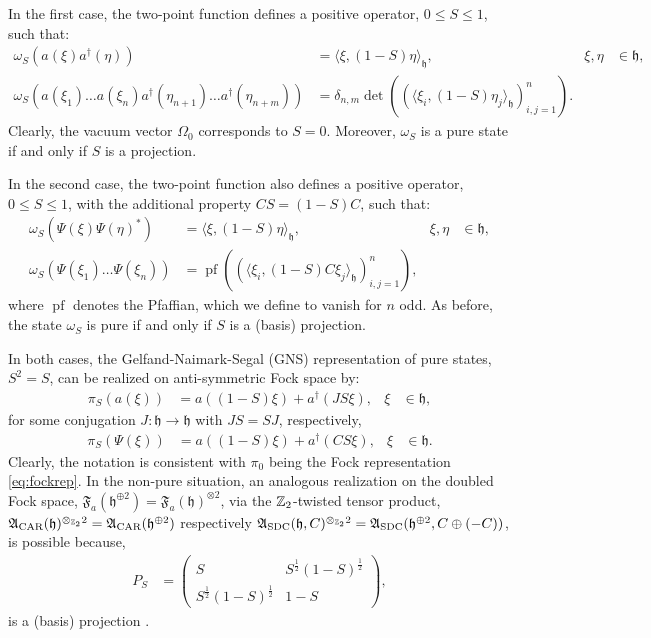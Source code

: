 \documentclass[a4paper, 11pt]{article}
\newcommand{\fA}{\mathfrak{A}}\newcommand{\cA}{\mathcal{A}}\newcommand{\dA}{\mathds{A}}\newcommand{\sA}{\mathscr{A}}
\newcommand{\fF}{\mathfrak{F}}\newcommand{\cF}{\mathcal{F}}\newcommand{\dF}{\mathds{F}}\newcommand{\sF}{\mathscr{F}}
\newcommand{\fh}{\mathfrak{h}}
\DeclareMathOperator{\1}{\mathds{1}}
\DeclareMathOperator{\pf}{pf}
\DeclareMathOperator{\CAR}{\textup{CAR}}
\DeclareMathOperator{\SDC}{\textup{SDC}}
\begin{document}
In the first case, the two-point function defines a positive operator, $0\leq S\leq1$, such that:
\begin{align}
\label{eq:carqfs}
\omega_{S}(a(\xi)a^{\dag}(\eta)) & = \langle\xi,(1-S)\eta\rangle_{\fh}, & \xi,\eta & \in\fh, \\ \nonumber
\omega_{S}(a(\xi_{1})\dots a(\xi_{n})a^{\dag}(\eta_{n+1})\dots a^{\dag}(\eta_{n+m})) & = \delta_{n,m}\det((\langle\xi_{i},(1-S)\eta_{j}\rangle_{\fh})_{i,j=1}^{n}).
\end{align}
Clearly, the vacuum vector $\Omega_{0}$ corresponds to $S=0$. Moreover, $\omega_{S}$ is a pure state if and only if $S$ is a projection.

In the second case, the two-point function also defines a positive operator, $0\leq S\leq 1$, with the additional property $CS = (1-S)C$, such that:
\begin{align}
\label{eq:sdcqfs}
\omega_{S}(\Psi(\xi)\Psi(\eta)^{*}) & = \langle\xi,(1-S)\eta\rangle_{\fh}, & \xi,\eta & \in\fh, \\ \nonumber
\omega_{S}(\Psi(\xi_{1})\dots \Psi(\xi_{n})) & = \pf((\langle\xi_{i},(1-S)C\xi_{j}\rangle_{\fh})_{i,j=1}^{n}),
\end{align}
where $\pf$ denotes the Pfaffian, which we define to vanish for $n$ odd. As before, the state $\omega_{S}$ is pure if and only if $S$ is a (basis) projection.

In both cases, the Gelfand-Naimark-Segal (GNS) representation of pure states, $S^{2}=S$, can be realized on anti-symmetric Fock space by:
\begin{align}
\label{eq:repqfpcar}
\pi_{S}(a(\xi)) & = a((1-S)\xi) + a^{\dag}(JS\xi), & \xi & \in\fh,
\end{align}
for some conjugation $J:\fh\rightarrow\fh$ with $JS = SJ$, respectively,
\begin{align}
\label{eq:repqfpsdc}
\pi_{S}(\Psi(\xi)) & = a((1-S)\xi) + a^{\dag}(CS\xi), & \xi & \in\fh.
\end{align}
Clearly, the notation is consistent with $\pi_{0}$ being the Fock representation \eqref{eq:fockrep}. In the non-pure situation, an analogous realization on the doubled Fock space, $\fF_{a}(\fh^{\oplus 2})=\fF_{a}(\fh)^{\otimes 2}$, via the $\mathbb{Z}_{2}$-twisted tensor product, $\fA_{\CAR}(\fh)^{\otimes_{\Z_{2}}2} = \fA_{\CAR}(\fh^{\oplus 2})$ respectively $\fA_{\SDC}(\fh,C)^{\otimes_{\Z_{2}}2} = \fA_{\SDC}(\fh^{\oplus 2},C\oplus(-C))$, is possible because,
\begin{align}
\label{eq:doubleproj}
P_{S} & = \begin{pmatrix} S & S^{\frac{1}{2}}(1-S)^{\frac{1}{2}} \\ S^{\frac{1}{2}}(1-S)^{\frac{1}{2}} & 1-S \end{pmatrix},
\end{align}
is a (basis) projection \cite{ArakiOnQuasiFree, LundbergQuasiFreeSecond}.
\end{document}
